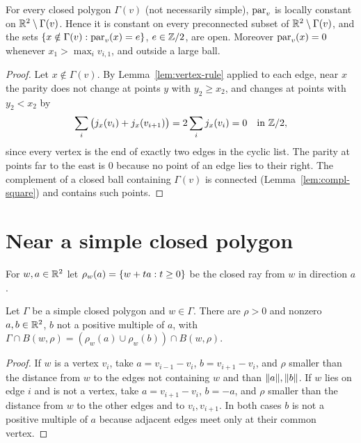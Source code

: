 
\begin{theorem}\label{thm:parity-loc-const}
For every closed polygon $\Gamma(v)$ (not necessarily simple), $\operatorname{par}_v$ is locally constant on
$\mathbb{R}^2\setminus\Gamma(v)$. Hence it is constant on every preconnected subset of
$\mathbb{R}^2\setminus\Gamma(v)$, and the sets $\left\{ x\notin\Gamma(v):\operatorname{par}_v(x)=e \right\}$, $e\in\mathbb{Z}/2$, are open.
Moreover $\operatorname{par}_v(x)=0$ whenever $x_1>\max_iv_{i,1}$, and outside a large ball.
\end{theorem}

\begin{proof}
Let $x\notin\Gamma(v)$. By Lemma~\ref{lem:vertex-rule} applied to each edge, near $x$ the parity
does not change at points $y$ with $y_2\ge x_2$, and changes at points with $y_2<x_2$ by
\[
\sum_i\big(j_x(v_i)+j_x(v_{i+1})\big)=2\sum_ij_x(v_i)=0\quad\text{in }\mathbb{Z}/2,
\]
since every vertex is the end of exactly two edges in the cyclic list. The parity at points far to
the east is $0$ because no point of an edge lies to their right. The complement of a closed ball
containing $\Gamma(v)$ is connected (Lemma~\ref{lem:compl-square}) and contains such points.
\end{proof}


\section{Near a simple closed polygon}

For $w,a\in\mathbb{R}^2$ let $\rho_w(a)=\left\{ w+ta:t\ge0 \right\}$ be the closed ray from $w$ in direction $a$.

\begin{lemma}\label{lem:local-rays}
Let $\Gamma$ be a simple closed polygon and $w\in\Gamma$. There are $\rho>0$ and nonzero
$a,b\in\mathbb{R}^2$, $b$ not a positive multiple of $a$, with
$\Gamma\cap B(w,\rho)=(\rho_w(a)\cup\rho_w(b))\cap B(w,\rho)$.
\end{lemma}

\begin{proof}
If $w$ is a vertex $v_i$, take $a=v_{i-1}-v_i$, $b=v_{i+1}-v_i$, and $\rho$ smaller than the
distance from $w$ to the edges not containing $w$ and than $\lVert a\rVert,\lVert b\rVert$. If $w$ lies on edge $i$
and is not a vertex, take $a=v_{i+1}-v_i$, $b=-a$, and $\rho$ smaller than the distance from $w$ to
the other edges and to $v_i,v_{i+1}$. In both cases $b$ is not a positive multiple of $a$ because
adjacent edges meet only at their common vertex.
\end{proof}


